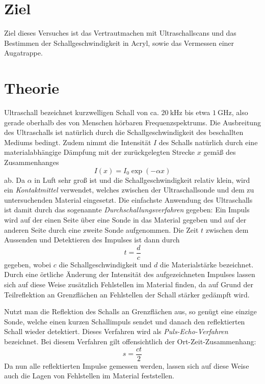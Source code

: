 \section{Ziel}
\label{sec:ziel}
Ziel dieses Versuches ist das Vertrautmachen mit Ultraschallscans und das Bestimmen der Schallgeschwindigkeit in Acryl, sowie das Vermessen einer Augatrappe.


\section{Theorie}
\label{sec:Theorie}

Ultraschall bezeichnet kurzwelligen Schall von ca. $\SI{20}{\kilo \hertz}$ bis etwa $\SI{1}{\giga \hertz}$, also gerade oberhalb des von Menschen hörbaren Frequenzspektrums.
Die Ausbreitung des Ultraschalls ist natürlich durch die Schallgeschwindigkeit des beschallten Mediums bedingt. Zudem nimmt die Intensität $I$ des Schalls natürlich durch eine materialabhängige Dämpfung mit der zurückgelegten Strecke $x$ gemäß des Zusammenhanges
\begin{equation}
  I(x) = I_0 \exp(-\alpha x)
  \label{eqn:I}
\end{equation}
ab. Da $\alpha$ in Luft sehr groß ist und die Schallgeschwindigkeit relativ klein, wird ein \textit{Kontaktmittel} verwendet, welches zwischen der Ultraschallsonde und dem zu untersuchenden Material eingesetzt.
Die einfachste Anwendung des Ultraschalls ist damit durch das sogenannte \textit{Durchschallungsverfahren} gegeben: Ein Impuls wird auf der einen Seite über eine Sonde in das Material gegeben und auf der anderen Seite durch eine zweite Sonde aufgenommen. Die Zeit $t$ zwischen dem Aussenden und Detektieren des Impulses ist dann durch
\begin{equation}
  t = \frac{d}{c}
  \label{eqn:durch}
\end{equation}
gegeben, wobei $c$ die Schallgeschwindigkeit und $d$ die Materialstärke bezeichnet. Durch eine örtliche Änderung der Intensität des aufgezeichneten Impulses lassen sich auf diese Weise zusätzlich Fehlstellen im Material finden, da auf Grund der Teilreflektion an Grenzflächen an Fehlstellen der Schall stärker gedämpft wird.

Nutzt man die Reflektion des Schalls an Grenzflächen aus, so genügt eine einzige Sonde, welche einen kurzen Schallimpuls sendet und danach den reflektierten Schall wieder detektiert. Dieses Verfahren wird als \textit{Puls-Echo-Verfahren} bezeichnet. Bei diesem Verfahren gilt offensichtlich der Ort-Zeit-Zusammenhang:
\begin{equation}
  s = \frac{ct}{2}
  \label{eqn:echo}
\end{equation}
Da nun alle reflektierten Impulse gemessen werden, lassen sich auf diese Weise auch die Lagen von Fehlstellen im Material feststellen.

